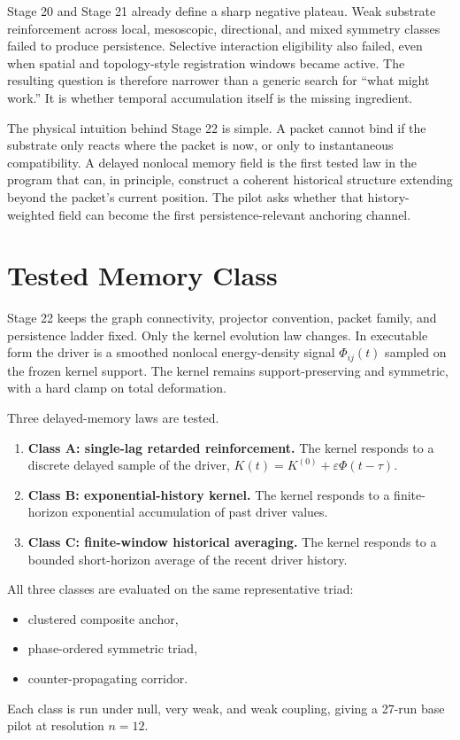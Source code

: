 \documentclass[11pt]{article}
\begin{document}
Stage 20 and Stage 21 already define a sharp negative plateau. Weak substrate reinforcement across local, mesoscopic, directional, and mixed symmetry classes failed to produce persistence. Selective interaction eligibility also failed, even when spatial and topology-style registration windows became active. The resulting question is therefore narrower than a generic search for ``what might work.'' It is whether temporal accumulation itself is the missing ingredient.

The physical intuition behind Stage 22 is simple. A packet cannot bind if the substrate only reacts where the packet is now, or only to instantaneous compatibility. A delayed nonlocal memory field is the first tested law in the program that can, in principle, construct a coherent historical structure extending beyond the packet's current position. The pilot asks whether that history-weighted field can become the first persistence-relevant anchoring channel.

\section{Tested Memory Class}

Stage 22 keeps the graph connectivity, projector convention, packet family, and persistence ladder fixed. Only the kernel evolution law changes. In executable form the driver is a smoothed nonlocal energy-density signal $\Phi_{ij}(t)$ sampled on the frozen kernel support. The kernel remains support-preserving and symmetric, with a hard clamp on total deformation.

Three delayed-memory laws are tested.
\begin{enumerate}
\item \textbf{Class A: single-lag retarded reinforcement.} The kernel responds to a discrete delayed sample of the driver, $K(t)=K^{(0)}+\varepsilon\Phi(t-\tau)$.
\item \textbf{Class B: exponential-history kernel.} The kernel responds to a finite-horizon exponential accumulation of past driver values.
\item \textbf{Class C: finite-window historical averaging.} The kernel responds to a bounded short-horizon average of the recent driver history.
\end{enumerate}

All three classes are evaluated on the same representative triad:
\begin{itemize}
\item clustered composite anchor,
\item phase-ordered symmetric triad,
\item counter-propagating corridor.
\end{itemize}
Each class is run under null, very weak, and weak coupling, giving a 27-run base pilot at resolution $n=12$.
\end{document}
